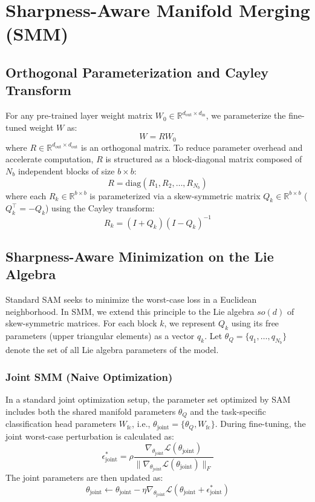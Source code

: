\documentclass{article}
\theoremstyle{plain}
\theoremstyle{definition}
\theoremstyle{remark}
\begin{document}
\section{Sharpness-Aware Manifold Merging (SMM)}
\label{sec:method}

\subsection{Orthogonal Parameterization and Cayley Transform}
For any pre-trained layer weight matrix $W_0 \in \mathbb{R}^{d_{\text{out}} \times d_{\text{in}}}$, we parameterize the fine-tuned weight $W$ as:
\begin{equation}
    W = R W_0
\end{equation}
where $R \in \mathbb{R}^{d_{\text{out}} \times d_{\text{out}}}$ is an orthogonal matrix. To reduce parameter overhead and accelerate computation, $R$ is structured as a block-diagonal matrix composed of $N_b$ independent blocks of size $b \times b$:
\begin{equation}
    R = \text{diag}(R_1, R_2, \dots, R_{N_b})
\end{equation}
where each $R_k \in \mathbb{R}^{b \times b}$ is parameterized via a skew-symmetric matrix $Q_k \in \mathbb{R}^{b \times b}$ ($Q_k^\top = -Q_k$) using the Cayley transform:
\begin{equation}
    R_k = (I + Q_k)(I - Q_k)^{-1}
\end{equation}

\subsection{Sharpness-Aware Minimization on the Lie Algebra}
Standard SAM seeks to minimize the worst-case loss in a Euclidean neighborhood. In SMM, we extend this principle to the Lie algebra $so(d)$ of skew-symmetric matrices. For each block $k$, we represent $Q_k$ using its free parameters (upper triangular elements) as a vector $q_k$. Let $\theta_Q = \{q_1, \dots, q_{N_b}\}$ denote the set of all Lie algebra parameters of the model.

\subsubsection{Joint SMM (Naive Optimization)}
In a standard joint optimization setup, the parameter set optimized by SAM includes both the shared manifold parameters $\theta_Q$ and the task-specific classification head parameters $W_{\text{fc}}$, i.e., $\theta_{\text{joint}} = \{\theta_Q, W_{\text{fc}}\}$. During fine-tuning, the joint worst-case perturbation is calculated as:
\begin{equation}
    \epsilon^*_{\text{joint}} = \rho \frac{\nabla_{\theta_{\text{joint}}} \mathcal{L}(\theta_{\text{joint}})}{\|\nabla_{\theta_{\text{joint}}} \mathcal{L}(\theta_{\text{joint}})\|_F}
\end{equation}
The joint parameters are then updated as:
\begin{equation}
    \theta_{\text{joint}} \leftarrow \theta_{\text{joint}} - \eta \nabla_{\theta_{\text{joint}}} \mathcal{L}(\theta_{\text{joint}} + \epsilon^*_{\text{joint}})
\end{equation}
\end{document}
